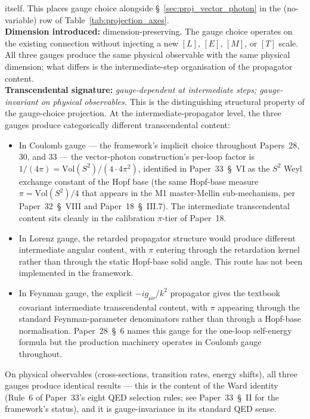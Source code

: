 itself.  This places gauge choice alongside \S~\ref{sec:proj_vector_photon}
in the (no-variable) row of Table~\ref{tab:projection_axes}.\\
\textbf{Dimension introduced:} dimension-preserving.  The gauge choice
operates on the existing connection without injecting a new $[L]$,
$[E]$, $[M]$, or $[T]$ scale.  All three gauges produce the same
physical observable with the same physical dimension; what differs is
the intermediate-step organisation of the propagator content.\\
\textbf{Transcendental signature:} \emph{gauge-dependent at
intermediate steps; gauge-invariant on physical observables.}  This is
the distinguishing structural property of the gauge-choice projection.
At the intermediate-propagator level, the three gauges produce
categorically different transcendental content:
\begin{itemize}\setlength{\itemsep}{2pt}
\item In Coulomb gauge --- the framework's implicit choice throughout
Papers~28, 30, and 33 --- the vector-photon construction's per-loop
factor is $1/(4\pi) = \mathrm{Vol}(S^2)/(4 \cdot 4\pi^2)$, identified
in Paper~33~\S~VI as the $S^2$ Weyl exchange constant of the Hopf
base (the same Hopf-base measure $\pi = \mathrm{Vol}(S^2)/4$ that
appears in the M1 master-Mellin sub-mechanism, per Paper~32~\S~VIII
and Paper~18~\S~III.7).  The intermediate transcendental content sits
cleanly in the calibration $\pi$-tier of Paper~18.
\item In Lorenz gauge, the retarded propagator structure would produce
different intermediate angular content, with $\pi$ entering through
the retardation kernel rather than through the static Hopf-base solid
angle.  This route has not been implemented in the framework.
\item In Feynman gauge, the explicit $-i g_{\mu\nu}/k^2$ propagator
gives the textbook covariant intermediate transcendental content, with
$\pi$ appearing through the standard Feynman-parameter denominators
rather than through a Hopf-base normalisation.  Paper~28~\S~6 names
this gauge for the one-loop self-energy formula but the production
machinery operates in Coulomb gauge throughout.
\end{itemize}
On physical observables (cross-sections, transition rates, energy
shifts), all three gauges produce identical results --- this is the
content of the Ward identity (Rule~6 of Paper~33's eight QED selection
rules; see Paper~33~\S~II for the framework's status), and it is
gauge-invariance in its standard QED sense.\\
